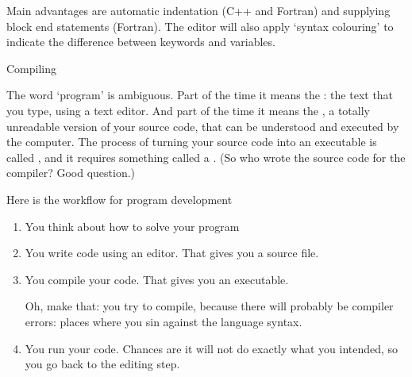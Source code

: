 Main advantages are automatic indentation (C++ and Fortran) and
supplying block end statements (Fortran). The editor will also apply
`syntax colouring' to indicate the difference between keywords and variables.

 {Compiling}

The word `program' is ambiguous. Part of the time it means the
: the text that you type, using a text
editor. And part of the time it means the , a
totally unreadable version of your source code, that can be understood and
executed by the computer. The process of turning your source code into
an executable is called , and it requires
something called a . (So who wrote the source code
for the compiler? Good question.)

Here is the workflow for program development
\begin{enumerate}
\item You think about how to solve your program
\item You write code using an editor. That gives you a source file.
\item You compile your code. That gives you an executable.

  Oh, make that: you try to compile,
  because there will probably be compiler errors: places where you
  sin against the language syntax.
\item You run your code. Chances are it will not do exactly what you
  intended, so you go back to the editing step.
\end{enumerate}

